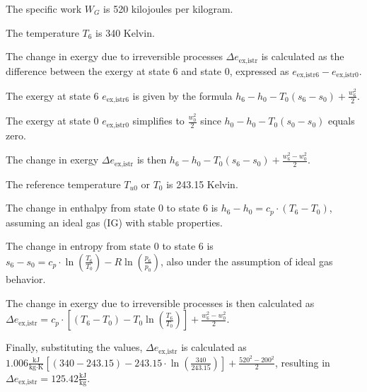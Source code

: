 The specific work \( W_G \) is 520 kilojoules per kilogram.

The temperature \( T_6 \) is 340 Kelvin.

The change in exergy due to irreversible processes \( \Delta e_{\text{ex,istr}} \) is calculated as the difference between the exergy at state 6 and state 0, expressed as \( e_{\text{ex,istr6}} - e_{\text{ex,istr0}} \).

The exergy at state 6 \( e_{\text{ex,istr6}} \) is given by the formula \( h_6 - h_0 - T_0 (s_6 - s_0) + \frac{w_6^2}{2} \).

The exergy at state 0 \( e_{\text{ex,istr0}} \) simplifies to \( \frac{w_0^2}{2} \) since \( h_0 - h_0 - T_0 (s_0 - s_0) \) equals zero.

The change in exergy \( \Delta e_{\text{ex,istr}} \) is then \( h_6 - h_0 - T_0 (s_6 - s_0) + \frac{w_6^2 - w_0^2}{2} \).

The reference temperature \( T_{u0} \) or \( T_0 \) is 243.15 Kelvin.

The change in enthalpy from state 0 to state 6 is \( h_6 - h_0 = c_p \cdot (T_6 - T_0) \), assuming an ideal gas (IG) with stable properties.

The change in entropy from state 0 to state 6 is \( s_6 - s_0 = c_p \cdot \ln \left( \frac{T_6}{T_0} \right) - R \ln \left( \frac{p_6}{p_0} \right) \), also under the assumption of ideal gas behavior.

The change in exergy due to irreversible processes is then calculated as \( \Delta e_{\text{ex,istr}} = c_p \cdot \left[ (T_6 - T_0) - T_0 \ln \left( \frac{T_6}{T_0} \right) \right] + \frac{w_6^2 - w_0^2}{2} \).

Finally, substituting the values, \( \Delta e_{\text{ex,istr}} \) is calculated as \( 1.006 \frac{\text{kJ}}{\text{kg} \cdot \text{K}} \left[ (340 - 243.15) - 243.15 \cdot \ln \left( \frac{340}{243.15} \right) \right] + \frac{520^2 - 200^2}{2} \), resulting in \( \Delta e_{\text{ex,istr}} = 125.42 \frac{\text{kJ}}{\text{kg}} \).